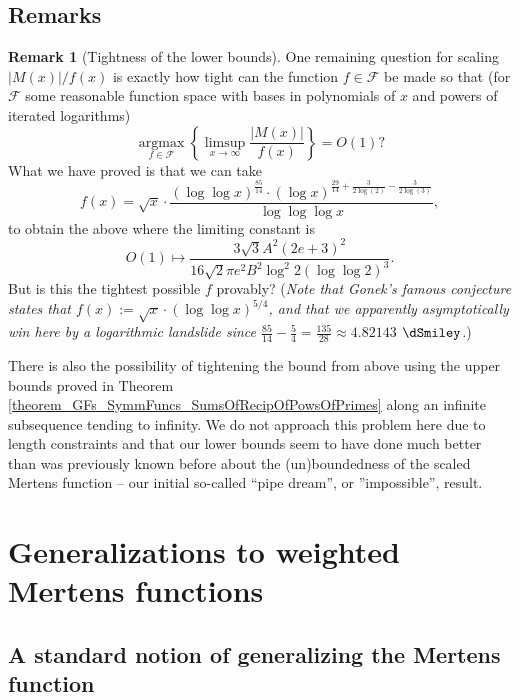 \documentclass[11pt,reqno,a4letter]{article}
\numberwithin{figure}{section}
\numberwithin{table}{section}
\theoremstyle{plain}
\numberwithin{theorem}{section}
\theoremstyle{definition}
\newtheorem{remark}[theorem]{Remark}
\begin{document}
\subsection{Remarks} 

\begin{remark}[Tightness of the lower bounds] 
One remaining question for scaling $|M(x)| / f(x)$ is exactly how tight can the function 
$f \in \mathcal{F}$ be made so that 
(for $\mathcal{F}$ some reasonable function space with bases in polynomials of $x$ and 
powers of iterated logarithms) 
\[
\operatorname{argmax}\limits_{f \in \mathcal{F}} 
     \left\{\limsup_{x \rightarrow \infty} \frac{|M(x)|}{f(x)}\right\} = O(1)? 
\] 
What we have proved is that we can take 
\[
f(x) =  \sqrt{x} \cdot \frac{(\log\log x)^{\frac{85}{14}} \cdot 
     (\log x)^{\frac{29}{14}+\frac{3}{2 \log (2)}-\frac{3}{2 \log (3)}}}{\log\log\log x}, 
\]
to obtain the above where the limiting constant is 
$$O(1) \mapsto \frac{3\sqrt{3} A^2(2e+3)^2}{16 \sqrt{2} \pi e^2 B^2 \log^2 2 (\log\log 2)^{3}}.$$ 
But is this the tightest possible $f$ provably? 
(\textit{Note that Gonek's famous conjecture states that $f(x) := \sqrt{x} \cdot (\log\log x)^{5/4}$, and 
that we apparently asymptotically win here by a logarithmic landslide since 
$\frac{85}{14} - \frac{5}{4} = \frac{135}{28} \approx 4.82143$ $\dSmiley$.}) 

There is also the possibility of tightening the bound from above using the upper bounds proved in 
Theorem \ref{theorem_GFs_SymmFuncs_SumsOfRecipOfPowsOfPrimes} 
along an infinite subsequence tending to infinity. We do not approach this problem here 
due to length constraints and that our lower bounds seem to have done much better than was 
previously known before about the (un)boundedness of the scaled Mertens function -- our initial 
so-called ``pipe dream'', or ''impossible'', result.  
\end{remark} 

\newpage
\section{Generalizations to weighted Mertens functions}
\label{Section_GensToWeightedMertensFuncs} 

\subsection{A standard notion of generalizing the Mertens function} 
\end{document}
